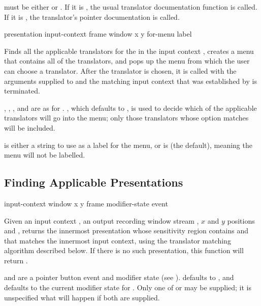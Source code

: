  must be either  or .  If it is
, the usual translator documentation function is called.  If it is
, the translator's pointer documentation is called.


 {presentation input-context frame window x y
                                 \key for-menu label}

Finds all the applicable translators for the 
 in the input context , creates a menu that
contains all of the translators, and pops up the menu from which the user can
choose a translator.  After the translator is chosen, it is called with the
arguments supplied to  and the matching input context
that was established by  is terminated.

, , , and  are as for
.  , which defaults to , is
used to decide which of the applicable translators will go into the menu; only
those translators whose  option matches  will be included.

 is either a string to use as a label for the menu, or is 
(the default), meaning the menu will not be labelled.


\subsection {Finding Applicable Presentations}

 {input-context window x y 
                                                 \key frame modifier-state event}

Given an input context , an output recording window stream
, $x$ and $y$ positions  and , returns the innermost
presentation whose sensitivity region contains  and  that matches
the innermost input context, using the translator matching algorithm described
below.  If there is no such presentation, this function will return .

 and  are a pointer button event and modifier
state (see ).   defaults to ,
and  defaults to the current modifier state for
.  Only one of  or  may be supplied;
it is unspecified what will happen if both are supplied.

